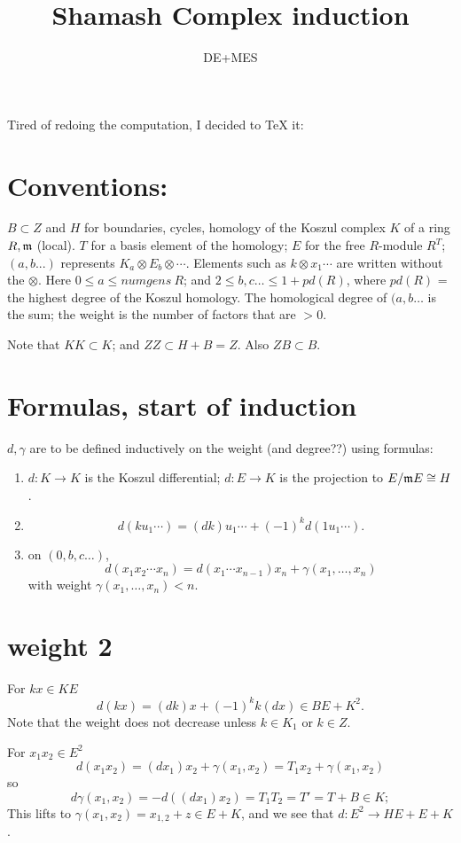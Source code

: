 \documentclass[11pt]{amsart}
\title{Shamash Complex induction}
\author{DE+MES}
\def\g{{\gamma}}
\def\mm{{\frak m}}
\begin{document}
\maketitle
Tired of redoing the computation, I decided to TeX it:

\section{Conventions:} $B\subset Z$ and  $H$ for boundaries, cycles, homology of the Koszul complex $K$ of a  ring $R,\mm$ (local). $T$ for a basis element of the homology; $E$ for the free $R$-module $R^T$; 
$(a,b...)$ represents $K_a\otimes E_b\otimes \cdots$. Elements such as $k\otimes x_1\cdots$ are written without the $\otimes$.
Here $0\leq a\leq numgens\ R$; and $2\leq b,c\dots\leq 1+pd(R)$, where $pd(R)$ = the highest degree of the Koszul homology. The homological degree of $(a,b\dots$ is the sum; the weight is the
number of factors that are $>0$.

Note that $KK \subset K$; and $ZZ\subset H+B = Z$. Also $ZB\subset B$.

\section{Formulas, start of induction}
$d,\g$ are to be defined inductively on the weight (and degree??) using formulas:

\begin{enumerate}
\item $d:K\to K$ is the Koszul differential; $d: E \to K$ is the projection to $E/\mm E \cong H$.
\item 
$$
d(ku_1\cdots) = (dk)u_1\cdots +(-1)^kd(1u_1\cdots).
$$
\item
on $(0,b,c\dots)$, 
$$
d(x_1x_2\cdots x_n) = d(x_1\cdots x_{n-1})x_n+\g(x_1,\dots, x_n)
$$
with weight $\g(x_1,\dots, x_n)<n$.
\end{enumerate}

\section{weight 2} 
For $kx\in KE$ 
$$
d(kx) = (dk)x+(-1)^k k(dx) \in BE+K^2.
$$
Note that the weight does not decrease unless $k\in K_1$ or $k \in Z$.

For $x_1x_2\in E^2$
$$
d(x_1x_2)= (dx_1)x_2 +\g(x_1,x_2) = T_1x_2+\gamma(x_1,x_2)
$$
so 
$$
d\gamma(x_1,x_2) = -d((dx_1)x_2) = T_1T_2 = T' = T+B  \in K;
$$
This lifts to $\g(x_1,x_2)=x_{1,2}+z \in E+K$, 
and we see that $d:E^2\to HE+ E+K$.
\end{document}
